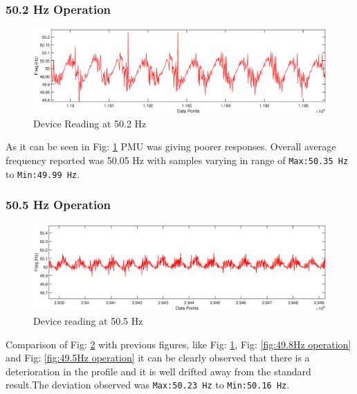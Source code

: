 \subsubsection{50.2 Hz Operation}
\begin{figure}[h]
	\includegraphics[width=\textwidth]{fig/502_Hz_freq.eps}
	\caption{Device Reading at 50.2 Hz}
	\label{fig:50.2Hz operation}
\end{figure}
As it can be seen in Fig: \ref{fig:50.2Hz operation} PMU was giving poorer responses. Overall average frequency reported was 50.05 Hz with samples varying in range of \texttt{Max:50.35 Hz} to \texttt{Min:49.99 Hz}.


\subsubsection{50.5 Hz Operation}
\begin{figure}[h]
	\includegraphics[width=\textwidth]{fig/505_Hz_freq.eps}
	\caption{Device reading at 50.5 Hz}
	\label{fig:50.5Hz operation}
\end{figure}
Comparison of Fig: \ref{fig:50.5Hz operation} with previous figures, like Fig: \ref{fig:50.2Hz operation}, Fig: \ref{fig:49.8Hz operation} and Fig: \ref{fig:49.5Hz operation} it can be clearly observed that there is a deterioration in the profile and it is well drifted away from the standard result.The deviation observed was \texttt{Max:50.23 Hz} to \texttt{Min:50.16 Hz}.

